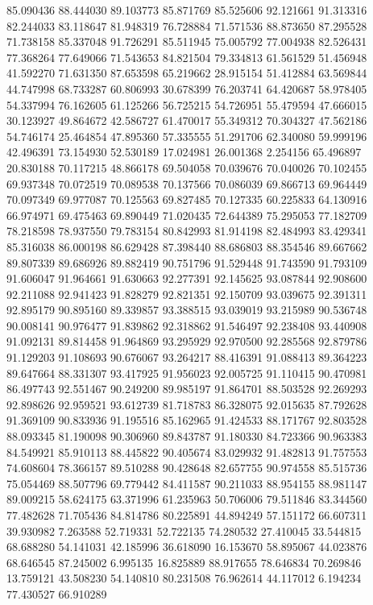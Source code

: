 85.090436
88.444030
89.103773
85.871769
85.525606
92.121661
91.313316
82.244033
83.118647
81.948319
76.728884
71.571536
88.873650
87.295528
71.738158
85.337048
91.726291
85.511945
75.005792
77.004938
82.526431
77.368264
77.649066
71.543653
84.821504
79.334813
61.561529
51.456948
41.592270
71.631350
87.653598
65.219662
28.915154
51.412884
63.569844
44.747998
68.733287
60.806993
30.678399
76.203741
64.420687
58.978405
54.337994
76.162605
61.125266
56.725215
54.726951
55.479594
47.666015
30.123927
49.864672
42.586727
61.470017
55.349312
70.304327
47.562186
54.746174
25.464854
47.895360
57.335555
51.291706
62.340080
59.999196
42.496391
73.154930
52.530189
17.024981
26.001368
2.254156
65.496897
20.830188
70.117215
48.866178
69.504058
70.039676
70.040026
70.102455
69.937348
70.072519
70.089538
70.137566
70.086039
69.866713
69.964449
70.097349
69.977087
70.125563
69.827485
70.127335
60.225833
64.130916
66.974971
69.475463
69.890449
71.020435
72.644389
75.295053
77.182709
78.218598
78.937550
79.783154
80.842993
81.914198
82.484993
83.429341
85.316038
86.000198
86.629428
87.398440
88.686803
88.354546
89.667662
89.807339
89.686926
89.882419
90.751796
91.529448
91.743590
91.793109
91.606047
91.964661
91.630663
92.277391
92.145625
93.087844
92.908600
92.211088
92.941423
91.828279
92.821351
92.150709
93.039675
92.391311
92.895179
90.895160
89.339857
93.388515
93.039019
93.215989
90.536748
90.008141
90.976477
91.839862
92.318862
91.546497
92.238408
93.440908
91.092131
89.814458
91.964869
93.295929
92.970500
92.285568
92.879786
91.129203
91.108693
90.676067
93.264217
88.416391
91.088413
89.364223
89.647664
88.331307
93.417925
91.956023
92.005725
91.110415
90.470981
86.497743
92.551467
90.249200
89.985197
91.864701
88.503528
92.269293
92.898626
92.959521
93.612739
81.718783
86.328075
92.015635
87.792628
91.369109
90.833936
91.195516
85.162965
91.424533
88.171767
92.803528
88.093345
81.190098
90.306960
89.843787
91.180330
84.723366
90.963383
84.549921
85.910113
88.445822
90.405674
83.029932
91.482813
91.757553
74.608604
78.366157
89.510288
90.428648
82.657755
90.974558
85.515736
75.054469
88.507796
69.779442
84.411587
90.211033
88.954155
88.981147
89.009215
58.624175
63.371996
61.235963
50.706006
79.511846
83.344560
77.482628
71.705436
84.814786
80.225891
44.894249
57.151172
66.607311
39.930982
7.263588
52.719331
52.722135
74.280532
27.410045
33.544815
68.688280
54.141031
42.185996
36.618090
16.153670
58.895067
44.023876
68.646545
87.245002
6.995135
16.825889
88.917655
78.646834
70.269846
13.759121
43.508230
54.140810
80.231508
76.962614
44.117012
6.194234
77.430527
66.910289
